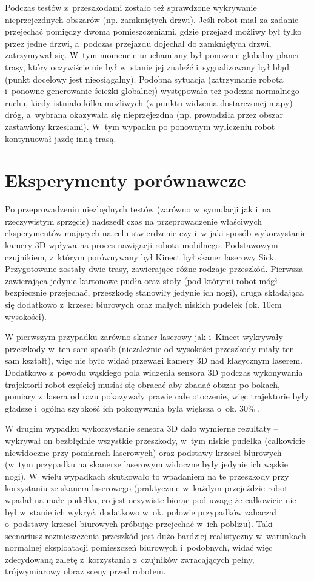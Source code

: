 Podczas testów z~przeszkodami zostało też sprawdzone wykrywanie nieprzejezdnych
obszarów (np. zamkniętych drzwi). Jeśli robot miał za zadanie przejechać pomiędzy
dwoma pomieszczeniami, gdzie przejazd możliwy był tylko przez jedne drzwi,
a~podczas przejazdu dojechał do zamkniętych drzwi, zatrzymywał się. W~tym 
momencie uruchamiany był ponownie globalny planer trasy, który oczywiście
nie był w~stanie jej znaleźć i~sygnalizowany był błąd (punkt docelowy jest
nieosiągalny). Podobna sytuacja (zatrzymanie robota i~ponowne generowanie 
ścieżki globalnej) występowała też podczas normalnego ruchu, kiedy istniało
kilka możliwych (z punktu widzenia dostarczonej mapy) dróg, a~wybrana okazywała
się nieprzejezdna (np. prowadziła przez obszar zastawiony krzesłami). W~tym 
wypadku po ponownym wyliczeniu robot kontynuował jazdę inną trasą.

\section{Eksperymenty porównawcze}

Po przeprowadzeniu niezbędnych testów (zarówno w~symulacji jak i~na rzeczywistym
sprzęcie) nadszedł czas na przeprowadzenie właściwych eksperymentów mających
na celu stwierdzenie czy i~w jaki sposób wykorzystanie kamery 3D wpływa na
proces nawigacji robota mobilnego. Podstawowym czujnikiem, z~którym porównywany
był Kinect był skaner laserowy Sick. Przygotowane zostały dwie trasy, zawierające
różne rodzaje przeszkód. Pierwsza zawierająca jedynie kartonowe pudła oraz
stoły (pod którymi robot mógł bezpiecznie przejechać, przeszkodę stanowiły 
jedynie ich nogi), druga składająca się dodatkowo z~krzeseł biurowych oraz
małych niskich pudełek (ok. 10cm wysokości). 

W pierwszym przypadku zarówno skaner laserowy jak i~Kinect wykrywały przeszkody 
w~ten sam sposób (niezależnie od wysokości przeszkody miały ten sam kształt), 
więc nie było widać przewagi kamery 3D nad klasycznym laserem. Dodatkowo z~powodu
wąskiego pola widzenia sensora 3D podczas wykonywania trajektorii robot częściej
musiał się obracać aby zbadać obszar po bokach, pomiary z~lasera od razu
pokazywały prawie całe otoczenie, więc trajektorie były gładsze i~ogólna
szybkość ich pokonywania była większa o~ok. 30\% .

W drugim wypadku wykorzystanie sensora 3D dało wymierne rezultaty -- wykrywał
on bezbłędnie wszystkie przeszkody, w~tym niskie pudełka (całkowicie niewidoczne
przy pomiarach laserowych) oraz podstawy krzeseł biurowych (w~tym przypadku 
na skanerze laserowym widoczne były jedynie ich wąskie nogi). W~wielu wypadkach
skutkowało to wpadaniem na te przeszkody przy korzystaniu ze skanera laserowego
(praktycznie w~każdym przejeździe robot wpadał na małe pudełka, co jest 
oczywiste biorąc pod uwagę że całkowicie nie był w~stanie ich wykryć, dodatkowo
w~ok. połowie przypadków zahaczał o~podstawy krzeseł biurowych próbując 
przejechać w~ich pobliżu). Taki scenariusz rozmieszczenia przeszkód jest 
dużo bardziej realistyczny w~warunkach normalnej eksploatacji pomieszczeń 
biurowych i~podobnych, widać więc zdecydowaną zaletę z~korzystania z~czujników
zwracających pełny, trójwymiarowy obraz sceny przed robotem. 

